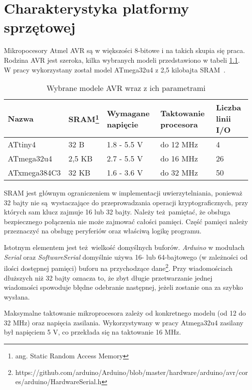 \chapter{Charakterystyka platformy sprzętowej}
\label{cha:hardware}

Mikropocesory Atmel AVR są w większości 8-bitowe i na takich skupia się praca. Rodzina AVR jest szeroka, kilka wybranych modeli przedstawiono w tabeli \ref{tab:avrmodels}. W pracy wykorzystany został model ATmega32u4 z 2,5 kilobajta SRAM~\cite{Atmega32}.

\begin{table}[h]
\centering
\caption{Wybrane modele AVR wraz z ich parametrami}
\begin{tabular}{|l|l|l|l|l|}
    \hline
    \textbf{Nazwa}  &
    \textbf{SRAM\footnote{ang. Static Random Access Memory}}  &
    \textbf{Wymagane napięcie}  &
    \textbf{Taktowanie procesora}  &
    \textbf{Liczba linii I/O} \\
    \hline
    ATtiny4 \cite{Attiny4}& 32 B & 1.8 - 5.5 V & do 12 MHz & 4\\
    \hline
    ATmega32u4 \cite{Atmega32} & 2,5 KB & 2.7 - 5.5 V & do 16 MHz & 26\\
    \hline
    ATxmega384C3 \cite{Atxmega384} & 32 KB & 1.6 - 3.6 V & do 32 MHz & 50\\
    \hline
\end{tabular}
\label{tab:avrmodels}
\end{table}

SRAM jest głównym ograniczeniem w implementacji uwierzytelniania, ponieważ 32 bajty nie są wystaczające do przeprowadzania operacji kryptograficznych, przy których sam klucz zajmuje 16 lub 32 bajty. Należy też pamiętać, że obsługa bezpiecznego połączenia nie może zajmować całości pamięci. Część pamięci należy przeznaczyć na obsługę peryferiów oraz właściwą logikę programu.

Istotnym elementem jest też wielkość domyślnych buforów. \emph{Arduino} w modułach \emph{Serial} oraz \emph{SoftwareSerial} domyślnie używa 16- lub 64-bajtowego (w zależności od ilości dostępnej pamięci) buforu na przychodzące dane\footnote{https://github.com/arduino/Arduino/blob/master/hardware/arduino/avr/cores/arduino/HardwareSerial.h}. Przy wiadomościach dłuższych niż 32 bajty oznacza to, że zbyt długie przetwarzanie jednej wiadomości spowoduje błędne odebranie następnej, jeżeli zostanie ona za szybko wysłana.

Maksymalne taktowanie mikroprocesora zależy od konkretnego modelu (od 12 do 32 MHz) oraz napięcia zasilania. Wykorzystywany w pracy Atmega32u4 zasilany był napięciem 5 V, co przekłada się na taktowanie 16 MHz.
